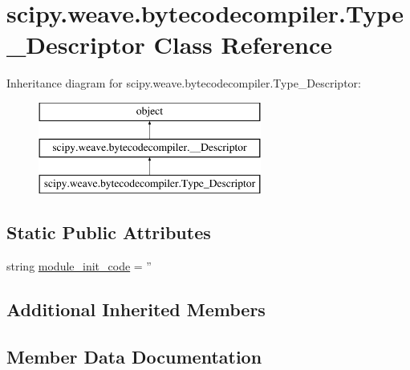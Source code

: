 \hypertarget{classscipy_1_1weave_1_1bytecodecompiler_1_1Type__Descriptor}{}\section{scipy.\+weave.\+bytecodecompiler.\+Type\+\_\+\+Descriptor Class Reference}
\label{classscipy_1_1weave_1_1bytecodecompiler_1_1Type__Descriptor}
Inheritance diagram for scipy.\+weave.\+bytecodecompiler.\+Type\+\_\+\+Descriptor\+:\begin{figure}[H]
\begin{center}
\leavevmode
\includegraphics[height=3.000000cm]{classscipy_1_1weave_1_1bytecodecompiler_1_1Type__Descriptor}
\end{center}
\end{figure}
\subsection*{Static Public Attributes}
\begin{DoxyCompactItemize}
\item 
string \hyperlink{classscipy_1_1weave_1_1bytecodecompiler_1_1Type__Descriptor_a1a5791dac8c9ab0bdaa5664387e87975}{module\+\_\+init\+\_\+code} = ''
\end{DoxyCompactItemize}
\subsection*{Additional Inherited Members}


\subsection{Member Data Documentation}
\hypertarget{classscipy_1_1weave_1_1bytecodecompiler_1_1Type__Descriptor_a1a5791dac8c9ab0bdaa5664387e87975}{}
